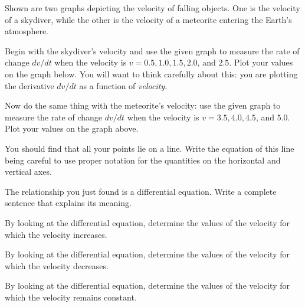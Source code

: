 \begin{activity} \label{A:6.6.2}  
Shown are two graphs depicting the velocity of falling objects.  One is the velocity of a skydiver, while the other is the velocity of a meteorite entering the Earth's atmosphere.

\ba
	\item Begin with the skydiver's velocity and use the given graph to measure the rate of change $dv/dt$ when the velocity is $v=0.5, 1.0, 1.5,
          2.0$, and $2.5$.  Plot your values on the graph below.  You
          will want to think carefully about this:  you are plotting
          the derivative $dv/dt$ as a function of {\em velocity}.

          \begin{center}
          \end{center}
        \item Now do the same thing with the meteorite's velocity:
          use the given graph to measure the rate of change $dv/dt$ when the velocity is
          $v=3.5,4.0,4.5$, and $5.0$.  Plot your values on the graph
          above. 
        \item You should find that all your points lie on a line.
          Write the equation of this line being careful to use proper
          notation for the quantities on the horizontal and vertical
          axes.
        \item The relationship you just found is a differential
          equation.  Write a complete sentence that explains its
          meaning. 
        \item By looking at the differential equation, determine the
          values of the velocity for which the velocity 
          increases.
        \item By looking at the differential equation, determine the
          values of the velocity for which the velocity 
          decreases.
        \item By looking at the differential equation, determine the
          values of the velocity for which the velocity 
          remains constant.

\ea
\end{activity}

